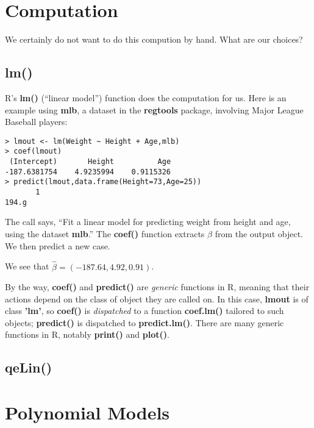 \section{Computation}

We certainly do not want to do this compution by hand.  What are our
choices?

\subsection{lm()}

R's \textbf{lm()} (``linear model'') function does the computation for
us.  Here is an example using \textbf{mlb}, a dataset in the
\textbf{regtools} package, involving Major League Baseball players:

\begin{lstlisting}
> lmout <- lm(Weight ~ Height + Age,mlb)
> coef(lmout)
 (Intercept)       Height          Age 
-187.6381754    4.9235994    0.9115326 
> predict(lmout,data.frame(Height=73,Age=25))
       1 
194.g
\end{lstlisting}

The call says, ``Fit a linear model for predicting weight from height
and age, using the dataset \textbf{mlb}.''  The \textbf{coef()} function
extracts $\widehat{\beta}$ from the output object.  We then predict a
new case.

We see that $\widehat{\beta} = (-187.64,4.92,0.91)$. 

By the way, \textbf{coef()} and \textbf{predict()} are \textit{generic}
functions in R, meaning that their actions depend on the class of object
they are called on.  In this case, \textbf{lmout} is of class
\textbf{'lm'}, so \textbf{coef()} is \textit{dispatched} to a function
\textbf{coef.lm()} tailored to such objects; \textbf{predict()} is
dispatched to \textbf{predict.lm()}.  There are many generic functions
in R, notably \textbf{print()} and \textbf{plot()}.

\subsection{qeLin()}

\section{Polynomial Models}

